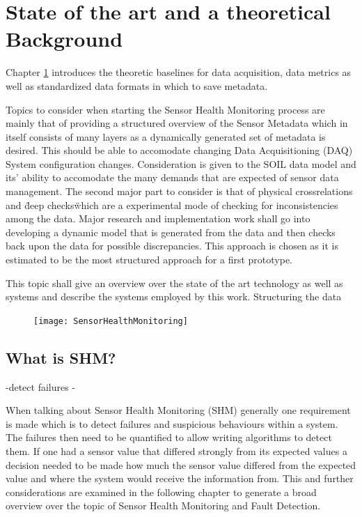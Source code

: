 

\chapter{State of the art and a theoretical Background}
\label{chap:2}
Chapter \ref{chap:2} introduces the theoretic baselines for data acquisition, data metrics as well as standardized data formats in which to save metadata.


Topics to consider when starting the Sensor Health Monitoring process are mainly that of providing a structured overview of the Sensor Metadata which in itself consists of many layers as a dynamically generated set of metadata is desired. This should be able to accomodate changing Data Acquisitioning (DAQ) System configuration changes.
Consideration is given to the SOIL data model and its' ability to accomodate the many demands that are expected of sensor data management. \cite{behrens_domain-specific_2021}
The second major part to consider is that of physical crossrelations and \"deep checks\" which are a experimental mode of checking for inconsistencies among the data.
Major research and implementation work shall go into developing a dynamic model that is generated from the data and then checks back upon the data for possible discrepancies. This approach is chosen as it is estimated to be the most structured approach for a first prototype.


This topic shall give an overview over the state of the art technology as well as systems and describe the systems employed by this work. Structuring the data


\begin{figure}[h]
    \centering
    \texttt{[image: SensorHealthMonitoring]}
    \caption{}
    \label{fig:shm}
\end{figure}


\section{What is SHM?}

-detect failures
-

When talking about Sensor Health Monitoring (SHM) generally one requirement is made which is to detect failures and suspicious behaviours within a system. The failures then need to be quantified to allow writing algorithms to detect them. If one had a sensor value that differed strongly from its expected values a decision needed to be made how much the sensor value differed from the expected value and where the system would receive the information from. This and further considerations are examined in the following chapter to generate a broad overview over the topic of Sensor Health Monitoring and Fault Detection.

